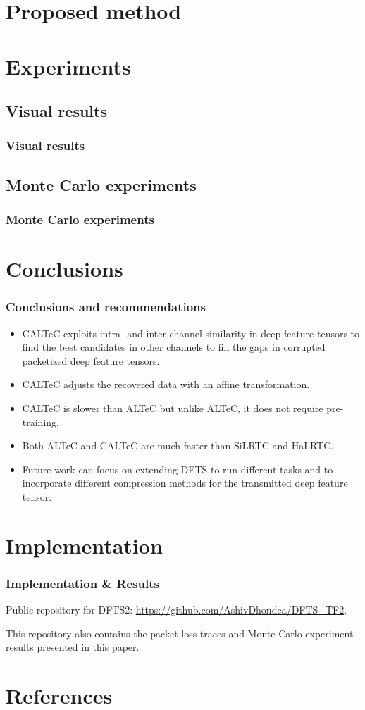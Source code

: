 \documentclass{beamer}
\begin{document}
\section{Proposed method}

\section{Experiments}
\subsection{Visual results}

\begin{frame}
    \frametitle{Visual results}
\end{frame}


\subsection{Monte Carlo experiments}

\begin{frame}
\frametitle{Monte Carlo experiments}
\end{frame}

\section{Conclusions}
\begin{frame}
	\frametitle{Conclusions and recommendations}
	\begin{itemize}
		\item CALTeC exploits intra- and inter-channel similarity in deep feature tensors to find the best candidates in other channels to fill the gaps in corrupted packetized deep feature tensors.
		\item CALTeC adjusts the recovered data with an affine transformation.
		\item CALTeC is slower than ALTeC but unlike ALTeC, it does not require pre-training.
		\item Both ALTeC and CALTeC are much faster than SiLRTC and HaLRTC.
		\item Future work can focus on extending DFTS to run different tasks and to incorporate different compression methods for the transmitted deep feature tensor.
	\end{itemize}
\end{frame}

\section{Implementation}
\begin{frame}
\frametitle{Implementation \& Results}
Public repository for DFTS2: \url{https://github.com/AshivDhondea/DFTS_TF2}.

This repository also contains the packet loss traces and Monte Carlo experiment results presented in this paper.
	\end{frame}
	
\section{References}


\end{document}

